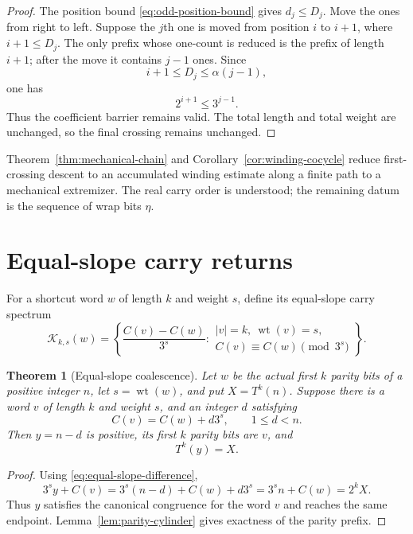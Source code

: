\documentclass[11pt,reqno]{amsart}
\numberwithin{equation}{section}
\newtheorem{theorem}{Theorem}[section]
\theoremstyle{definition}
\theoremstyle{remark}
\newcommand{\set}[1]{\left\{#1\right\}}
\DeclareMathOperator{\wt}{wt}
\begin{document}
\begin{proof}
The position bound \eqref{eq:odd-position-bound} gives $d_j\le D_j$.  Move
the ones from right to left.  Suppose the $j$th one is moved from position
$i$ to $i+1$, where $i+1\le D_j$.  The only prefix whose one-count is
reduced is the prefix of length $i+1$; after the move it contains $j-1$
ones.  Since
\[
i+1\le D_j\le\alpha(j-1),
\]
one has
\[
2^{i+1}\le3^{j-1}.
\]
Thus the coefficient barrier remains valid.  The total length and total
weight are unchanged, so the final crossing remains unchanged.
\end{proof}

Theorem~\ref{thm:mechanical-chain} and Corollary~\ref{cor:winding-cocycle}
reduce first-crossing descent to an accumulated winding estimate along a
finite path to a mechanical extremizer.  The real carry order is understood;
the remaining datum is the sequence of wrap bits $\eta$.

\section{Equal-slope carry returns}\label{sec:equal-slope}

For a shortcut word $w$ of length $k$ and weight $s$, define its equal-slope
carry spectrum
\begin{equation}\label{eq:carry-spectrum}
\mathcal K_{k,s}(w)
=
\set{
\frac{C(v)-C(w)}{3^s}:
\begin{array}{l}
|v|=k,\ \wt(v)=s,\\
C(v)\equiv C(w)\pmod{3^s}
\end{array}
}.
\end{equation}

\begin{theorem}[Equal-slope coalescence]\label{thm:equal-slope}
Let $w$ be the actual first $k$ parity bits of a positive integer $n$, let
$s=\wt(w)$, and put $X=T^k(n)$.  Suppose there is a word $v$ of length $k$
and weight $s$, and an integer $d$ satisfying
\begin{equation}\label{eq:equal-slope-difference}
C(v)=C(w)+d3^s,
\qquad
1\le d<n.
\end{equation}
Then $y=n-d$ is positive, its first $k$ parity bits are $v$, and
\begin{equation}\label{eq:equal-slope-coalesce}
T^k(y)=X.
\end{equation}
\end{theorem}

\begin{proof}
Using \eqref{eq:equal-slope-difference},
\[
3^sy+C(v)
=3^s(n-d)+C(w)+d3^s
=3^sn+C(w)
=2^kX.
\]
Thus $y$ satisfies the canonical congruence for the word $v$ and reaches the
same endpoint.  Lemma~\ref{lem:parity-cylinder} gives exactness of the parity
prefix.
\end{proof}
\end{document}
